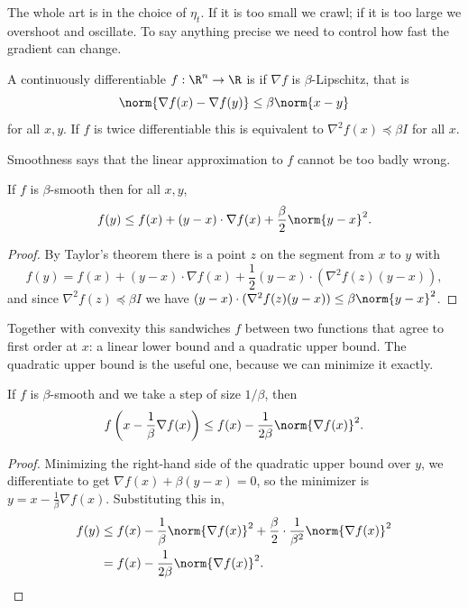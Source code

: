 The whole art is in the choice of $\eta_t$. If it is too small we crawl; if it is too large we overshoot and oscillate. To say anything precise we need to control how fast the gradient can change.

\begin{definition}[Smoothness]
    A continuously differentiable $f : \R^n \rightarrow \R$ is  if $\nabla f$ is $\beta$-Lipschitz, that is
    $$
    \norm{\nabla f(x) - \nabla f(y)} \leq \beta \norm{x - y}
    $$
    for all $x, y$. If $f$ is twice differentiable this is equivalent to $\nabla^2 f(x) \preceq \beta I$ for all $x$.
\end{definition}

Smoothness says that the linear approximation to $f$ cannot be too badly wrong.

\begin{lemma}
    If $f$ is $\beta$-smooth then for all $x, y$,
    $$
    f(y) \leq f(x) + (y - x) \cdot \nabla f(x) + \frac{\beta}{2} \norm{y - x}^2.
    $$
\end{lemma}
\begin{proof}
    By Taylor's theorem there is a point $z$ on the segment from $x$ to $y$ with
    $$
    f(y) = f(x) + (y-x)\cdot \nabla f(x) + \frac{1}{2}(y - x)\cdot (\nabla^2 f(z)(y-x)),
    $$
    and since $\nabla^2 f(z) \preceq \beta I$ we have $(y-x)\cdot (\nabla^2 f(z)(y-x)) \leq \beta \norm{y-x}^2$.
\end{proof}

Together with convexity this sandwiches $f$ between two functions that agree to first order at $x$: a linear lower bound and a quadratic upper bound. The quadratic upper bound is the useful one, because we can minimize it exactly.

\begin{corollary}
    If $f$ is $\beta$-smooth and we take a step of size $1/\beta$, then
    $$
    f\left(x - \frac{1}{\beta}\nabla f(x)\right) \leq f(x) - \frac{1}{2\beta}\norm{\nabla f(x)}^2.
    $$
\end{corollary}
\begin{proof}
    Minimizing the right-hand side of the quadratic upper bound over $y$, we differentiate to get $\nabla f(x) + \beta(y - x) = 0$, so the minimizer is $y = x - \frac{1}{\beta}\nabla f(x)$. Substituting this in,
    \begin{align*}
        f(y) &\leq f(x) - \frac{1}{\beta}\norm{\nabla f(x)}^2 + \frac{\beta}{2}\cdot \frac{1}{\beta^2}\norm{\nabla f(x)}^2 \\
        &= f(x) - \frac{1}{2\beta}\norm{\nabla f(x)}^2. \qedhere
    \end{align*}
\end{proof}

